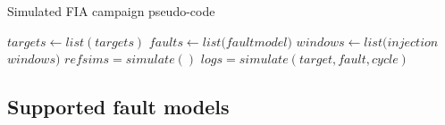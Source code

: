 \begin{algorithm}
    \caption{Simulated FIA campaign pseudo-code}
    \label{algo:pseudoCodeSimuStages}
    \normalsize
    \begin{algorithmic}[1]
        \Require $targets \leftarrow list(targets)$
        \Require $faults \leftarrow list(fault$\textunderscore$model)$
        \Require $windows \leftarrow list(injection$\textunderscore$windows)$
            \State $ref$\textunderscore$sims = simulate()$
                        \State $logs = simulate(target, fault, cycle)$
                    \EndFor
                \EndFor
            \EndFor
    \end{algorithmic}
\end{algorithm}

\subsection{Supported fault models}
\label{subsec:supported_fault_models}

